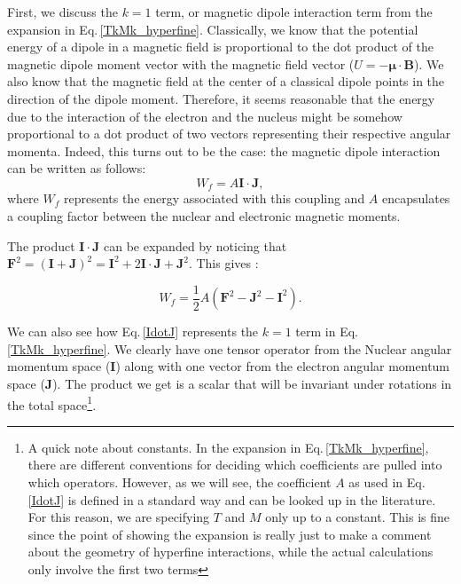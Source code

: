 First, we discuss the $k=1$ term, or magnetic dipole interaction term from the expansion in Eq.\,\ref{TkMk_hyperfine}. Classically, we know that the potential energy of a dipole in a magnetic field is proportional to the dot product of the magnetic dipole moment vector with the magnetic field vector ($U=-\mathbf{\mu}\cdot\mathbf{B}$). We also know that the magnetic field at the center of a classical dipole points in the direction of the dipole moment. Therefore, it seems reasonable that the energy due to the interaction of the electron and the nucleus might be somehow proportional to a dot product of two vectors representing their respective angular momenta. Indeed, this turns out to be the case: the magnetic dipole interaction can be written as follows\cite{sobelman_spectra}: 
\begin{equation}\label{IdotJ}
W_f=A\mathbf{I}\cdot\mathbf{J},
\end{equation}
where $W_f$ represents the energy associated with this coupling and $A$ encapsulates a coupling factor between the nuclear and electronic magnetic moments. 

The product $\mathbf{I}\cdot\mathbf{J}$ can be expanded by noticing that $\mathbf{F}^2=(\mathbf{I}+\mathbf{J})^2=\mathbf{I}^2+2 \mathbf{I}\cdot\mathbf{J}+\mathbf{J}^2$. This gives \cite{cuaMITnotes}\cite{sobelman_spectra}: 

\begin{equation}\label{Wf_dot_product}
W_f=\frac{1}{2}A(\mathbf{F}^2-\mathbf{J}^2-\mathbf{I}^2).
\end{equation}

We can also see how Eq.\,\ref{IdotJ} represents the $k=1$ term in Eq.\,\ref{TkMk_hyperfine}. We clearly have one tensor operator from the Nuclear angular momentum space ($\mathbf{I}$) along with one vector from the electron angular momentum space ($\mathbf{J}$). The product we get is a scalar that will be invariant under rotations in the total space\footnote{A quick note about constants. In the expansion in Eq.\,\ref{TkMk_hyperfine}, there are different conventions \cite{schwartz_hyperfine_expansion} for deciding which coefficients are pulled into which operators. However, as we will see, the coefficient $A$ as used in Eq.\,\ref{IdotJ} is defined in a standard way and can be looked up in the literature. For this reason, we are specifying $T$ and $M$ only up to a constant. This is fine since the point of showing the expansion is really just to make a comment about the geometry of hyperfine interactions, while the actual calculations only involve the first two terms}.

